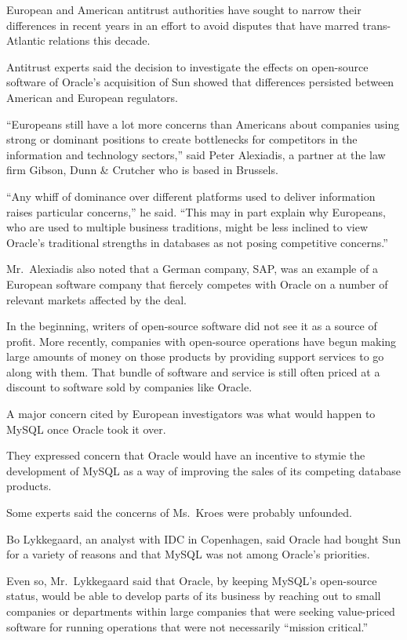 ﻿\documentclass[12pt]{article}
\begin{document}
European and American antitrust authorities have sought to narrow their differences in recent years
in an effort to avoid disputes that have marred trans-Atlantic relations this decade.

Antitrust experts said the decision to investigate the effects on open-source software of Oracle's
acquisition of Sun showed that differences persisted between American and European regulators.

``Europeans still have a lot more concerns than Americans about companies using strong or dominant
positions to create bottlenecks for competitors in the information and technology sectors,'' said
Peter Alexiadis, a partner at the law firm Gibson, Dunn \& Crutcher who is based in Brussels.

``Any whiff\cite{whiff} of dominance over different platforms used to deliver information raises
particular concerns,'' he said. ``This may in part explain why Europeans, who are used to multiple
business traditions, might be less inclined to view Oracle's traditional strengths in databases as
not posing competitive concerns.''

Mr.~Alexiadis also noted that a German company, SAP, was an example of a European software company
that fiercely competes with Oracle on a number of relevant markets affected by the deal.

In the beginning, writers of open-source software did not see it as a source of profit. More
recently, companies with open-source operations have begun making large amounts of money on those
products by providing support services to go along with them. That bundle of software and service is
still often priced at a discount to software sold by companies like Oracle.

A major concern cited by European investigators was what would happen to MySQL once Oracle took it
over.

They expressed concern that Oracle would have an incentive to stymie the development of MySQL as a
way of improving the sales of its competing database products.

Some experts said the concerns of Ms.~Kroes were probably unfounded.

Bo Lykkegaard, an analyst with IDC in Copenhagen, said Oracle had bought Sun for a variety of
reasons and that MySQL was not among Oracle's priorities.

Even so, Mr.~Lykkegaard said that Oracle, by keeping MySQL's open-source status, would be able to
develop parts of its business by reaching out to small companies or departments within large
companies that were seeking value-priced software for running operations that were not necessarily
``mission critical.''
\end{document}
